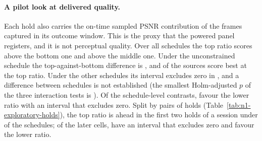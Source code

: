 \paragraph{A pilot look at delivered quality.}
Each hold also carries the on-time sampled PSNR contribution of the frames captured in its outcome window. This is the proxy that the powered panel registers, and it is not perceptual quality. Over all schedules the top ratio scores \NOneExpUtility{} \NOneExpUtilityT{} above the bottom one and \NOneExpUtilityTop{} \NOneExpUtilityTopT{} above the middle one. Under the unconstrained schedule the top-against-bottom difference is \NOneExpFreeUtility{} \NOneExpFreeUtilityT{}, and \NOneExpFreeBestTop{} of the \NOneSources{} sources score best at the top ratio. Under the \NOneExpHeldSchedules{} other schedules its interval excludes zero in \NOneExpHeldUtilityEstablished{}, and a difference between schedules is not established (the smallest Holm-adjusted $p$ of the three interaction tests is \NOneExpInteractionP{}). Of the \NOneExpUtilityContrasts{} schedule-level contrasts, \NOneExpLowerBetter{} favour the lower ratio with an interval that excludes zero. Split by pairs of holds (Table~\ref{tab:n1-exploratory-holds}), the top ratio is ahead in the first two holds of a session under \NOneExpEarlyAhead{} of the \NOneExpSchedules{} schedules; of the \NOneExpLaterCells{} later cells, \NOneExpLaterEstablished{} have an interval that excludes zero and \NOneExpLaterLowerBetter{} favour the lower ratio.

\begin{table}[t]
\centering\small

\caption{Exploratory. Difference between ratios 1.05 and 0.65 in the on-time sampled PSNR contribution, by capacity schedule and pair of holds within a session, with 95\% intervals over sources. The pairs fall mostly in the first, second and third capacity phase.}
\label{tab:n1-exploratory-holds}
\end{table}

\ifdefined\NOneCondSignals
